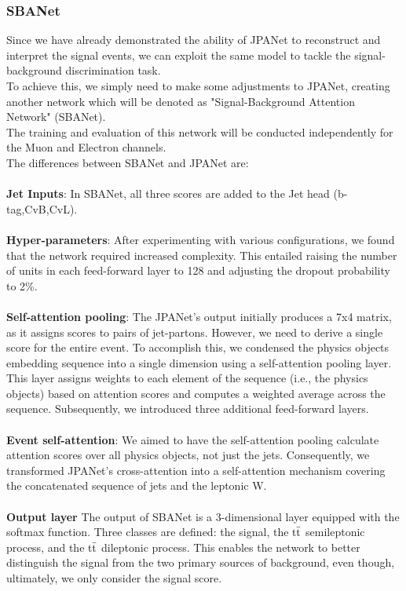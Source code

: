 \subsubsection*{SBANet} Since we have already demonstrated the ability of JPANet to reconstruct and interpret the signal events, we can exploit the same model to tackle the signal-background discrimination task.\\
To achieve this, we simply need to make some adjustments to JPANet, creating another network which will be denoted as "Signal-Background Attention Network" (SBANet).\\
The training and evaluation of this network will be conducted independently for the Muon and Electron channels.
\\
The differences between SBANet and JPANet are:\\
\\
\textbf{Jet Inputs}: In SBANet, all three \DeepJet scores are added to the Jet head (b-tag,CvB,CvL).
\\
\\
\textbf{Hyper-parameters}: After experimenting with various configurations, we found that the network required increased complexity. This entailed raising the number of units in each feed-forward layer to 128 and adjusting the dropout probability to 2\%.
\\
\\
\textbf{Self-attention pooling}: The JPANet's output initially produces a 7x4 matrix, as it assigns scores to pairs of jet-partons. However, we need to derive a single score for the entire event. To accomplish this, we condensed the physics objects embedding sequence into a single dimension using a self-attention pooling layer. This layer assigns weights to each element of the sequence (i.e., the physics objects) based on attention scores and computes a weighted average across the sequence. Subsequently, we introduced three additional feed-forward layers.
\\
\\
\textbf{Event self-attention}: We aimed to have the self-attention pooling calculate attention scores over all physics objects, not just the jets. Consequently, we transformed JPANet's cross-attention into a self-attention mechanism covering the concatenated sequence of jets and the leptonic W.
\\
\\
\textbf{Output layer} The output of SBANet is a 3-dimensional layer equipped with the softmax function. Three classes are defined: the signal, the ${{\text{t}}{\bar{\text{t}}}}$ semileptonic process, and the ${{\text{t}}{\bar{\text{t}}}}$ dileptonic process. This enables the network to better distinguish the signal from the two primary sources of background, even though, ultimately, we only consider the signal score.
